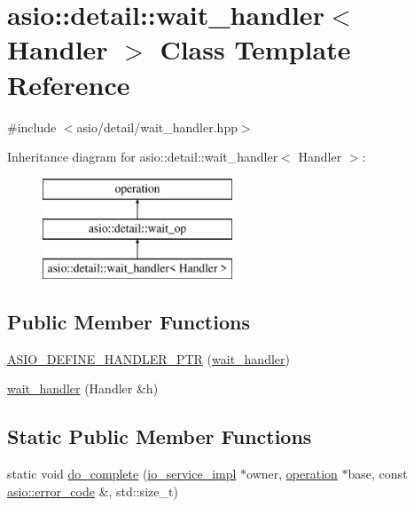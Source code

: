 \hypertarget{classasio_1_1detail_1_1wait__handler}{}\section{asio\+:\+:detail\+:\+:wait\+\_\+handler$<$ Handler $>$ Class Template Reference}
\label{classasio_1_1detail_1_1wait__handler}


{\ttfamily \#include $<$asio/detail/wait\+\_\+handler.\+hpp$>$}

Inheritance diagram for asio\+:\+:detail\+:\+:wait\+\_\+handler$<$ Handler $>$\+:\begin{figure}[H]
\begin{center}
\leavevmode
\includegraphics[height=3.000000cm]{classasio_1_1detail_1_1wait__handler}
\end{center}
\end{figure}
\subsection*{Public Member Functions}
\begin{DoxyCompactItemize}
\item 
\hyperlink{classasio_1_1detail_1_1wait__handler_a1fd5acc7d8b075868962e555b8041f71}{A\+S\+I\+O\+\_\+\+D\+E\+F\+I\+N\+E\+\_\+\+H\+A\+N\+D\+L\+E\+R\+\_\+\+P\+T\+R} (\hyperlink{classasio_1_1detail_1_1wait__handler}{wait\+\_\+handler})
\item 
\hyperlink{classasio_1_1detail_1_1wait__handler_aa3902f9842fbda5570e78414f7ca0b11}{wait\+\_\+handler} (Handler \&h)
\end{DoxyCompactItemize}
\subsection*{Static Public Member Functions}
\begin{DoxyCompactItemize}
\item 
static void \hyperlink{classasio_1_1detail_1_1wait__handler_a6be414f7efcf4ed67940d1740678c4d8}{do\+\_\+complete} (\hyperlink{namespaceasio_1_1detail_a6d61d9b8e53c11288be549d82aec5a42}{io\+\_\+service\+\_\+impl} $\ast$owner, \hyperlink{namespaceasio_1_1detail_a338968609bec20e37145309f8f9ec936}{operation} $\ast$base, const \hyperlink{classasio_1_1error__code}{asio\+::error\+\_\+code} \&, std\+::size\+\_\+t)
\end{DoxyCompactItemize}
